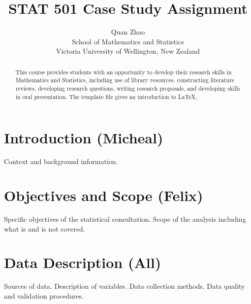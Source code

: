 \documentclass[12pt]{article}
\title{STAT 501 Case Study Assignment}
\author{Quan Zhao\\
School of Mathematics and Statistics\\ Victoria University of Wellington, New Zealand}
\begin{document}
\maketitle

\begin{abstract}
  This course provides students with an opportunity to develop their
  research skills in Mathematics and Statistics, including use of
  library resources, constructing literature reviews, developing
  research questions, writing research proposals, and developing
  skills in oral presentation. The template file gives an introduction
  to LaTeX,
\end{abstract}


\tableofcontents


\setlength{\baselineskip}{0.25in} %





\newpage  %
\section{Introduction (Micheal)}

\label{s.intro}

Context and background information.

\section{Objectives and Scope (Felix)}

Specific objectives of the statistical consultation.
Scope of the analysis including what is and is not covered.



\section{Data Description (All)}

Sources of data.
Description of variables.
Data collection methods.
Data quality and validation procedures.
\end{document}
